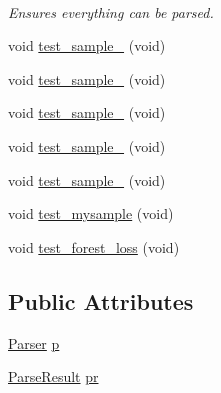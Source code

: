\begin{DoxyCompactItemize}
$$\begin{DoxyCompactList}\small\item\em Ensures everything can be parsed. \end{DoxyCompactList}\item 
void \hyperlink{classAstTestSuite_ade48304a65cbc7449bd22ec9097b6a8c}{test\-\_\-sample\-\_} (void)
\item 
void \hyperlink{classAstTestSuite_af764267aa9a94610fd5307ae81107312}{test\-\_\-sample\-\_} (void)
\item 
void \hyperlink{classAstTestSuite_a956750fe55d2eb218eb75bd7dc75bc34}{test\-\_\-sample\-\_} (void)
\item 
void \hyperlink{classAstTestSuite_a665836b3d23c82eda3233a3c5d2f0ba4}{test\-\_\-sample\-\_} (void)
\item 
void \hyperlink{classAstTestSuite_a9cceb7f0e5a6714d539f25db38424851}{test\-\_\-sample\-\_} (void)
\item 
void \hyperlink{classAstTestSuite_adbc7de61740aaf9ebf9b7e25f024f318}{test\-\_\-mysample} (void)
\item 
void \hyperlink{classAstTestSuite_ade9231acfe5f8c8f02e00e54749cf99b}{test\-\_\-forest\-\_\-loss} (void)
\end{DoxyCompactItemize}
\subsection*{Public Attributes}
\begin{DoxyCompactItemize}
\item 
\hyperlink{classParser}{Parser} \hyperlink{classAstTestSuite_a148a26ab78abac732d857d7095f6dea5}{p}
\item 
\hyperlink{classParseResult}{Parse\-Result} \hyperlink{classAstTestSuite_ab27964f1743a2889538ca27e644eb1aa}{pr}
\end{DoxyCompactItemize}


